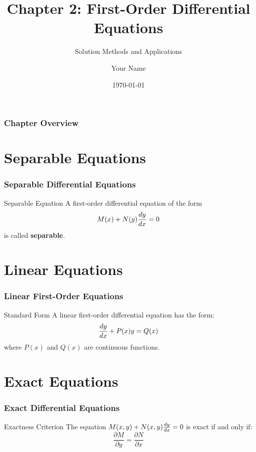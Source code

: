 


\title[Chapter 2]{Chapter 2: First-Order Differential Equations}
\subtitle{Solution Methods and Applications}
\author{Your Name}
\date{\today}



\begin{frame}
    \titlepage
\end{frame}

\begin{frame}
    \frametitle{Chapter Overview}
    \tableofcontents
\end{frame}

\section{Separable Equations}

\begin{frame}
    \frametitle{Separable Differential Equations}
    
    \begin{definitionbox}{Separable Equation}
        A first-order differential equation of the form
        \[
        M(x) + N(y)\frac{dy}{dx} = 0
        \]
        is called \textbf{separable}.
    \end{definitionbox}
\end{frame}

\section{Linear Equations}

\begin{frame}
    \frametitle{Linear First-Order Equations}
    
    \begin{definitionbox}{Standard Form}
        A linear first-order differential equation has the form:
        \[
        \frac{dy}{dx} + P(x)y = Q(x)
        \]
        where $P(x)$ and $Q(x)$ are continuous functions.
    \end{definitionbox}
\end{frame}

\section{Exact Equations}

\begin{frame}
    \frametitle{Exact Differential Equations}
    
    \begin{theorembox}{Exactness Criterion}
        The equation $M(x,y) + N(x,y)\frac{dy}{dx} = 0$ is exact if and only if:
        \[
        \frac{\partial M}{\partial y} = \frac{\partial N}{\partial x}
        \]
    \end{theorembox}
\end{frame}

